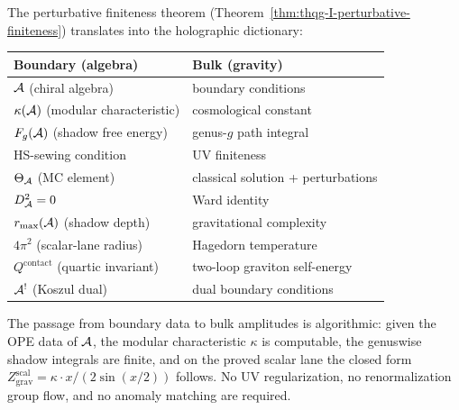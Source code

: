 \begin{remark}
\label{rem:thqg-I-holographic-dictionary}
The perturbative finiteness theorem (Theorem~\ref{thm:thqg-I-perturbative-finiteness}) translates into the holographic dictionary:
\begin{center}
\renewcommand{\arraystretch}{1.3}
\begin{tabular}{l|l}
\textbf{Boundary (algebra)} & \textbf{Bulk (gravity)} \\
\hline
$\mathcal{A}$ (chiral algebra) & boundary conditions \\
$\kappa(\mathcal{A})$ (modular characteristic) & cosmological constant \\
$F_g(\mathcal{A})$ (shadow free energy) & genus-$g$ path integral \\
HS-sewing condition & UV finiteness \\
$\Theta_{\mathcal{A}}$ (MC element) & classical solution + perturbations \\
$D_{\mathcal{A}}^2 = 0$ & Ward identity \\
$r_{\max}(\mathcal{A})$ (shadow depth) & gravitational complexity \\
	$4\pi^2$ (scalar-lane radius) & Hagedorn temperature \\
$Q^{\mathrm{contact}}$ (quartic invariant) & two-loop graviton self-energy \\
$\mathcal{A}^!$ (Koszul dual) & dual boundary conditions \\
\end{tabular}
\end{center}
The passage from boundary data to bulk amplitudes is algorithmic: given
the OPE data of $\mathcal{A}$, the modular characteristic $\kappa$ is
computable, the genuswise shadow integrals are finite, and on the
proved scalar lane the closed form
$Z_{\mathrm{grav}}^{\mathrm{scal}} = \kappa \cdot x/(2\sin(x/2))$
follows. No UV regularization, no renormalization group flow, and no
anomaly matching are required.
\end{remark}

